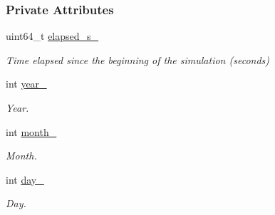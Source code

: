\subsubsection*{Private Attributes}
\begin{DoxyCompactItemize}
\item 
\mbox{\label{classosse_1_1collaborate_1_1_packet_raw_aad8310207b7e3d74633874497145331d}} 
uint64\+\_\+t \hyperlink{classosse_1_1collaborate_1_1_packet_raw_aad8310207b7e3d74633874497145331d}{elapsed\+\_\+s\+\_\+}
\begin{DoxyCompactList}\small\item\em Time elapsed since the beginning of the simulation (seconds) \end{DoxyCompactList}\item 
\mbox{\label{classosse_1_1collaborate_1_1_packet_raw_ac5502a36a4d412da7c1bcf23d1d603df}} 
int \hyperlink{classosse_1_1collaborate_1_1_packet_raw_ac5502a36a4d412da7c1bcf23d1d603df}{year\+\_\+}
\begin{DoxyCompactList}\small\item\em Year. \end{DoxyCompactList}\item 
\mbox{\label{classosse_1_1collaborate_1_1_packet_raw_ae8f7fb3902fbe0c792ecfc8bb22014e0}} 
int \hyperlink{classosse_1_1collaborate_1_1_packet_raw_ae8f7fb3902fbe0c792ecfc8bb22014e0}{month\+\_\+}
\begin{DoxyCompactList}\small\item\em Month. \end{DoxyCompactList}\item 
\mbox{\label{classosse_1_1collaborate_1_1_packet_raw_ab0890b912acf38237e5a2908b69a017c}} 
int \hyperlink{classosse_1_1collaborate_1_1_packet_raw_ab0890b912acf38237e5a2908b69a017c}{day\+\_\+}
\begin{DoxyCompactList}\small\item\em Day. \end{DoxyCompactList}\item 
\mbox{\label{classosse_1_1collaborate_1_1_packet_raw_aca4527edca0a59fd3c3b3ec48a07141e}} 

\end{DoxyCompactItemize}
